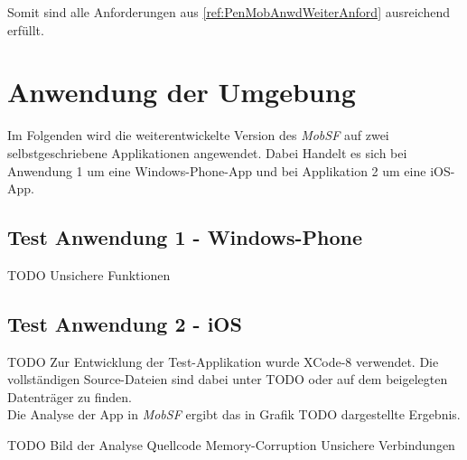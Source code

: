 Somit sind alle Anforderungen aus \ref{ref:PenMobAnwdWeiterAnford} ausreichend erfüllt.


\section{Anwendung der Umgebung}
	Im Folgenden wird die weiterentwickelte Version des \textit{MobSF} auf zwei selbstgeschriebene Applikationen angewendet. Dabei Handelt es sich bei Anwendung 1 um eine Windows-Phone-App und bei Applikation 2 um eine iOS-App.

	\subsection{Test Anwendung 1 - Windows-Phone}
	TODO
	Unsichere Funktionen
	
	\subsection{Test Anwendung 2 - iOS}
	TODO
	Zur Entwicklung der Test-Applikation wurde XCode-8 verwendet. Die vollständigen Source-Dateien sind dabei unter TODO oder auf dem beigelegten Datenträger zu finden.\\
	
	Die Analyse der App in \textit{MobSF} ergibt das in Grafik TODO dargestellte Ergebnis.
	
	TODO Bild der Analyse
	Quellcode
		Memory-Corruption
		Unsichere Verbindungen
	
	
